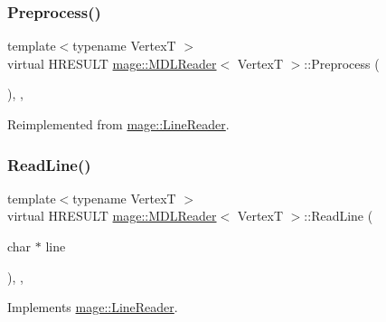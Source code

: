 \hypertarget{classmage_1_1_m_d_l_reader_a90958769a03cd25246b3aae740ecbcd6}{}\label{classmage_1_1_m_d_l_reader_a90958769a03cd25246b3aae740ecbcd6} 
\subsubsection{\texorpdfstring{Preprocess()}{Preprocess()}}
{\footnotesize\ttfamily template$<$typename VertexT $>$ \\
virtual H\+R\+E\+S\+U\+LT \hyperlink{classmage_1_1_m_d_l_reader}{mage\+::\+M\+D\+L\+Reader}$<$ VertexT $>$\+::Preprocess (\begin{DoxyParamCaption}{ }\end{DoxyParamCaption})\hspace{0.3cm}{\ttfamily [override]}, {\ttfamily [private]}, {\ttfamily [virtual]}}



Reimplemented from \hyperlink{classmage_1_1_line_reader_a9a67c9527f499f19489f0680caa66ac9}{mage\+::\+Line\+Reader}.

\hypertarget{classmage_1_1_m_d_l_reader_a9c38ef1fdaf1e4bda13392b4cb0c29cf}{}\label{classmage_1_1_m_d_l_reader_a9c38ef1fdaf1e4bda13392b4cb0c29cf} 
\subsubsection{\texorpdfstring{Read\+Line()}{ReadLine()}}
{\footnotesize\ttfamily template$<$typename VertexT $>$ \\
virtual H\+R\+E\+S\+U\+LT \hyperlink{classmage_1_1_m_d_l_reader}{mage\+::\+M\+D\+L\+Reader}$<$ VertexT $>$\+::Read\+Line (\begin{DoxyParamCaption}\item[{char $\ast$}]{line }\end{DoxyParamCaption})\hspace{0.3cm}{\ttfamily [override]}, {\ttfamily [private]}, {\ttfamily [virtual]}}



Implements \hyperlink{classmage_1_1_line_reader_a193ad5c9084eb87e8a98a3c1782d93ff}{mage\+::\+Line\+Reader}.

\hypertarget{classmage_1_1_m_d_l_reader_a5fa8fa91dca9bea47a6bbf407e854be7}{}\label{classmage_1_1_m_d_l_reader_a5fa8fa91dca9bea47a6bbf407e854be7} 
